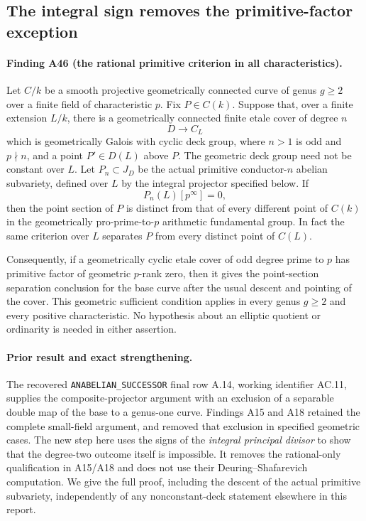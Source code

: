 \subsection{The integral sign removes the primitive-factor exception}
\label{sec:primitive-integral-sign}

\paragraph{Finding A46 (the rational primitive criterion in all characteristics).}
Let $C/k$ be a smooth projective geometrically connected curve of
genus $g\ge2$ over a finite field of characteristic $p$.
Fix $P\in C(k)$. Suppose that, over a finite extension $L/k$,
there is a geometrically connected finite etale cover of degree $n$
\[
               D\longrightarrow C_L
\]
which is geometrically Galois with cyclic deck group, where
$n>1$ is odd and $p\nmid n$, and a point $P'\in D(L)$ above $P$.
The geometric deck group need not be constant over $L$.
Let $P_n\subset J_D$ be the actual primitive conductor-$n$
abelian subvariety, defined over $L$ by the integral projector
specified below. If
\[
                         P_n(L)[p^\infty]=0,
 \tag{IS.1}
\]
then the point section of $P$ is distinct from that of every
different point of $C(k)$ in the geometrically pro-prime-to-$p$
arithmetic fundamental group. In fact the same criterion over
$L$ separates $P$ from every distinct point of $C(L)$.

Consequently, if a geometrically cyclic etale cover of odd degree
prime to $p$ has primitive factor of geometric $p$-rank zero,
then it gives the point-section separation conclusion for the
base curve after the usual descent and pointing of the cover.
This geometric sufficient condition applies in every genus
$g\ge2$ and every positive characteristic.
No hypothesis about an elliptic quotient or ordinarity is needed
in either assertion.

\paragraph{Prior result and exact strengthening.}
The recovered \texttt{ANABELIAN\_SUCCESSOR} final row A.14,
working identifier AC.11, supplies the composite-projector
argument with an exclusion of a separable double map of the base
to a genus-one curve. Findings A15 and A18 retained the complete
small-field argument, and removed that exclusion in specified
geometric cases. The new step here uses the signs of the
\emph{integral principal divisor} to show that the degree-two
outcome itself is impossible. It removes the rational-only
qualification in A15/A18 and does not use their
Deuring--Shafarevich computation. We give the full proof, including
the descent of the actual primitive subvariety, independently of
any nonconstant-deck statement elsewhere in this report.

